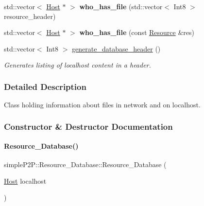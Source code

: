 \begin{DoxyCompactItemize}
\mbox{\label{classsimpleP2P_1_1Resource__Database_a5c1d8606f2d7396067b2d3af76d44d5e}} 
std\+::vector$<$ \hyperlink{classsimpleP2P_1_1Host}{Host} $\ast$ $>$ {\bfseries who\+\_\+has\+\_\+file} (std\+::vector$<$ Int8 $>$ resource\+\_\+header)
\item 
\mbox{\label{classsimpleP2P_1_1Resource__Database_aa0ad4b139f041ecee802de8e9768c0a6}} 
std\+::vector$<$ \hyperlink{classsimpleP2P_1_1Host}{Host} $\ast$ $>$ {\bfseries who\+\_\+has\+\_\+file} (const \hyperlink{classsimpleP2P_1_1Resource}{Resource} \&res)
\item 
std\+::vector$<$ Int8 $>$ \hyperlink{classsimpleP2P_1_1Resource__Database_a3c226a6c72d0796cc9b86bda01502cbf}{generate\+\_\+database\+\_\+header} ()
\begin{DoxyCompactList}\small\item\em Generates listing of localhost content in a header. \end{DoxyCompactList}\end{DoxyCompactItemize}


\subsubsection{Detailed Description}
Class holding information about files in network and on localhost. 

\subsubsection{Constructor \& Destructor Documentation}
\mbox{\label{classsimpleP2P_1_1Resource__Database_a0158b1b1c4583d60534c2bea5dc437a3}} 
\paragraph{\texorpdfstring{Resource\+\_\+\+Database()}{Resource\_Database()}}
{\footnotesize\ttfamily simple\+P2\+P\+::\+Resource\+\_\+\+Database\+::\+Resource\+\_\+\+Database (\begin{DoxyParamCaption}\item[{\hyperlink{classsimpleP2P_1_1Host}{Host}}]{localhost }\end{DoxyParamCaption})}



